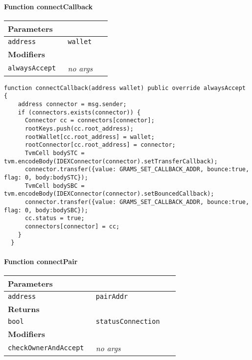\paragraph{Function connectCallback}


\ifsoltables
\noindent\begin{tabular}{|l|l|p{5cm}|}\hline
\multicolumn{3}{|l|}{\bf Parameters}\\\hline
\tt address & \tt wallet &\\\hline
\multicolumn{3}{|l|}{\bf Modifiers}\\\hline
\tt alwaysAccept & {\em no args} &\\\hline
\end{tabular}
\fi

\vspace{2cm}

\begin{lstlisting}[firstnumber=181]
  function connectCallback(address wallet) public override alwaysAccept {
    address connector = msg.sender;
    if (connectors.exists(connector)) {
      Connector cc = connectors[connector];
      rootKeys.push(cc.root_address);
      rootWallet[cc.root_address] = wallet;
      rootConnector[cc.root_address] = connector;
      TvmCell bodySTC = tvm.encodeBody(IDEXConnector(connector).setTransferCallback);
      connector.transfer({value: GRAMS_SET_CALLBACK_ADDR, bounce:true, flag: 0, body:bodySTC});
      TvmCell bodySBC = tvm.encodeBody(IDEXConnector(connector).setBouncedCallback);
      connector.transfer({value: GRAMS_SET_CALLBACK_ADDR, bounce:true, flag: 0, body:bodySBC});
      cc.status = true;
      connectors[connector] = cc;
    }
  }
\end{lstlisting}

\paragraph{Function connectPair}


\ifsoltables
\noindent\begin{tabular}{|l|l|p{5cm}|}\hline
\multicolumn{3}{|l|}{\bf Parameters}\\\hline
\tt address & \tt pairAddr &\\\hline
\multicolumn{3}{|l|}{\bf Returns}\\\hline
\tt bool & \tt statusConnection &\\\hline
\multicolumn{3}{|l|}{\bf Modifiers}\\\hline
\tt checkOwnerAndAccept & {\em no args} &\\\hline
\end{tabular}
\fi

